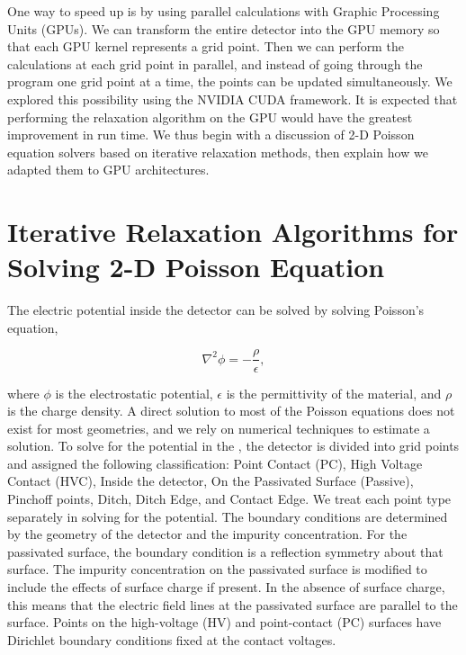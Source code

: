One way to speed up {\ehd} is by using parallel calculations with Graphic Processing Units (GPUs). We can transform the entire detector into the GPU memory so that each GPU kernel represents a grid point. Then we can perform the calculations at each grid point in parallel, and instead of going through the program one grid point at a time, the points can be updated simultaneously. We explored this possibility using the NVIDIA CUDA {\cpp} framework. It is expected that performing the relaxation algorithm on the GPU would have the greatest improvement in run time. We thus begin with a discussion of 2-D Poisson equation solvers based on iterative relaxation methods, then explain how we adapted them to GPU architectures.

\section{Iterative Relaxation Algorithms for Solving 2-D Poisson Equation}

The electric potential inside the detector can be solved by solving Poisson’s equation,

\begin{equation}
    \nabla^2 \phi= -\frac{\rho}{\epsilon},
\end{equation}

where $\phi$ is the electrostatic potential, $\epsilon$ is the permittivity of the material, and $\rho$ is the charge density. A direct solution to most of the Poisson equations does not exist for most geometries, and we rely on numerical techniques to estimate a solution. To solve for the potential in the {\ehd}, the detector is divided into grid points and assigned the following classification: Point Contact (PC), High Voltage Contact (HVC), Inside the detector, On the Passivated Surface (Passive), Pinchoff points, Ditch, Ditch Edge, and Contact Edge. We treat each point type separately in solving for the potential. The boundary conditions are determined by the geometry of the detector and the impurity concentration. For the passivated surface, the boundary condition is a reflection symmetry about that surface. The impurity concentration on the passivated surface is modified to include the effects of surface charge if present. In the absence of surface charge, this means that the electric field lines at the passivated surface are parallel to the surface. Points on the high-voltage (HV) and point-contact (PC) surfaces have Dirichlet boundary conditions fixed at the contact voltages.

